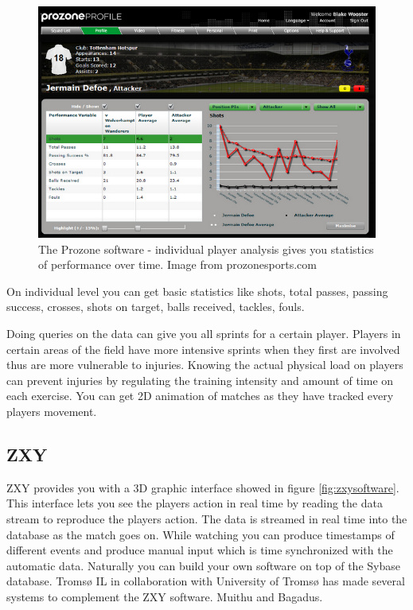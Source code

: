 \begin{figure}[ht!]
\centering
\includegraphics[width=1\textwidth]{images/general/prozonestats.png}
\caption{The Prozone software - individual player analysis gives you statistics of performance over time. Image from prozonesports.com}
\label{overflow}
\end{figure}

On individual level you can get basic statistics like shots, total passes, passing success, crosses, shots on target, balls received, tackles, fouls. 

Doing queries on the data can give you all sprints for a certain player. Players in certain areas of the field have more intensive sprints when they first are involved thus are more vulnerable to injuries. Knowing the actual physical load on players can prevent injuries by regulating the training intensity and amount of time on each exercise. You can get 2D animation of matches as they have tracked every players movement. 

\subsection{ZXY}
ZXY provides you with a 3D graphic interface showed in figure \ref{fig:zxysoftware}. This interface lets you see the players action in real time by reading the data stream to reproduce the players action. The data is streamed in real time into the database as the match goes on. While watching you can produce timestamps of different events and produce manual input which is time synchronized with the automatic data. Naturally you can build your own software on top of the Sybase database. Tromsø IL in collaboration with University of Tromsø has made several systems to complement the ZXY software. Muithu and Bagadus.

